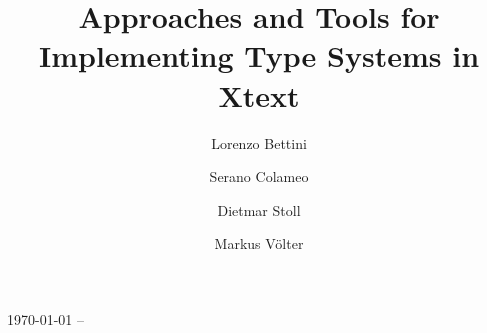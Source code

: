 \documentclass{llncs}
\begin{document}
%
\pagestyle{headings}  %


\title{Approaches and Tools for Implementing Type Systems in Xtext}

%
%
\author{Lorenzo Bettini \and Serano
Colameo \and Dietmar
Stoll  \and Markus V\"olter}
%
%


\maketitle              %

\begin{abstract}
 
\end{abstract}

\today{} -- \currenttime



 

\end{document}
